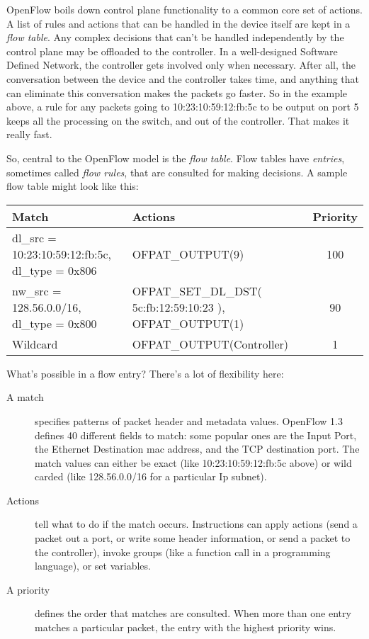 OpenFlow boils down control plane functionality to a common core set of actions.
A list of rules and actions that can be handled in the device itself are kept in a \textit{flow table}.
Any complex decisions that can't be handled independently by the control plane may be offloaded to the controller.  
In a well-designed Software Defined Network, the controller gets involved only when necessary.
After all, the conversation between the device and the controller takes time, and anything that can 
eliminate this conversation makes the packets go faster.
So in the example above, a rule for any packets going to 10:23:10:59:12:fb:5c to be output on port 5 keeps all the processing on the switch, and out of the controller.  
That makes it really fast.  

So, central to the OpenFlow model is the \textit{flow table}.  
Flow tables have \textit{entries}, sometimes called \textit{flow rules}, that are consulted for making decisions.
A sample flow table might look like this:

\bigskip
\begin{tabularx}{6in}{|X|X|c|}
\hline\hline
Match & Actions & Priority
\\ \hline
dl\_src = 10:23:10:59:12:fb:5c, dl\_type = 0x806 & OFPAT\_OUTPUT(9) & 100 
\\ \hline
nw\_src = 128.56.0.0/16, dl\_type = 0x800 & OFPAT\_SET\_DL\_DST( 5c:fb:12:59:10:23 ), OFPAT\_OUTPUT(1) & 90 
\\ \hline
Wildcard & OFPAT\_OUTPUT(Controller) & 1
\end{tabularx}

\bigskip

What's possible in a flow entry?
There's a lot of flexibility here:

\begin{description}
\item[A match] specifies patterns of packet header and metadata values.
OpenFlow 1.3 defines 40 different fields to match: some popular ones are the Input Port, 
the Ethernet Destination mac address, and the TCP destination port.
The match values can either be exact (like 10:23:10:59:12:fb:5c above) or wild carded (like 128.56.0.0/16 for a
particular Ip subnet).
\item[Actions] tell what to do if the match occurs.  
Instructions can apply actions (send a packet out a port, or write some header information, 
or send a packet to the controller), 
invoke groups (like a function call in a programming language), or set variables.
\item[A priority] defines the order that matches are consulted.  
When more than one entry matches a particular packet, the entry with the highest priority wins.
\end{description}

